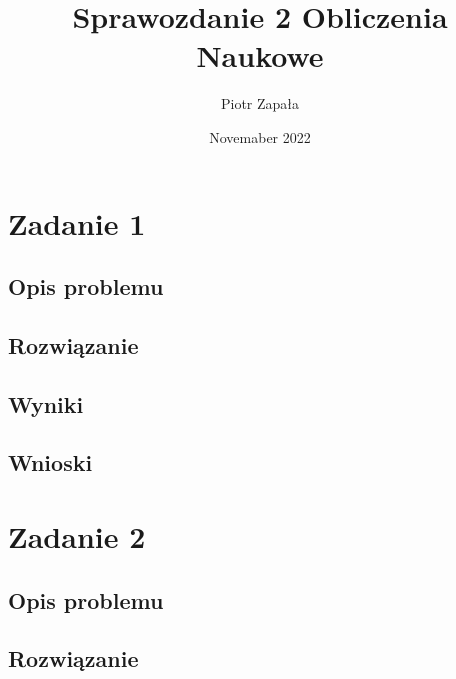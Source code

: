\documentclass{article}
\title{Sprawozdanie 2 Obliczenia Naukowe}
\author{Piotr Zapała}
\date{Novemaber 2022}
\begin{document}
\maketitle

\tableofcontents
\newpage
\begin{center}
    \section{Zadanie 1}
    \subsection{Opis problemu}

    \subsection{Rozwiązanie}
    \begin{flushleft}

    \end{flushleft}

     \begin{flushleft}

    \end{flushleft}

     \begin{flushleft}

    \end{flushleft}

    \subsection{Wyniki}

    \subsection{Wnioski}

    \section{Zadanie 2}
    \subsection{Opis problemu}

    \subsection{Rozwiązanie}


\end{center}
\end{document}
